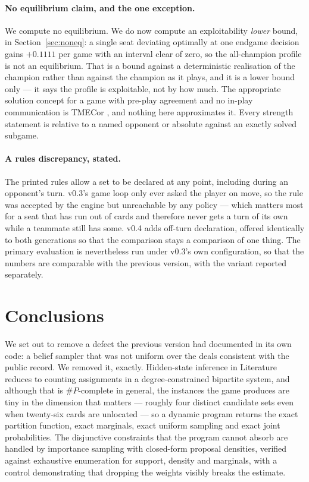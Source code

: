 \documentclass[11pt,a4paper]{article}
\begin{document}
\paragraph{No equilibrium claim, and the one exception.} We compute no
equilibrium. We do now compute an exploitability \emph{lower} bound, in
Section~\ref{sec:noneq}: a single seat deviating optimally at one endgame
decision gains $+0.1111$ per game with an
interval clear of zero, so the all-champion profile is not an equilibrium. That
is a bound against a deterministic realisation of the champion rather than
against the champion as it plays, and it is a lower bound only --- it says the
profile is exploitable, not by how much. The appropriate solution concept for a game with pre-play
agreement and no in-play communication is TMECor
\citep{celli2018computational}, and nothing here approximates it. Every strength
statement is relative to a named opponent or absolute against an exactly solved
subgame.

\paragraph{A rules discrepancy, stated.} The printed rules allow a set to be
declared at any point, including during an opponent's turn. v0.3's game loop
only ever asked the player on move, so the rule was accepted by the engine but
unreachable by any policy --- which matters most for a seat that has run out of
cards and therefore never gets a turn of its own while a teammate still has
some. v0.4 adds off-turn declaration, offered identically to both generations
so that the comparison stays a comparison of one thing. The primary evaluation
is nevertheless run under v0.3's own configuration, so that the numbers are
comparable with the previous version, with the variant reported separately.

\section{Conclusions}
\label{sec:conclusions}

We set out to remove a defect the previous version had documented in its own
code: a belief sampler that was not uniform over the deals consistent with the
public record. We removed it, exactly. Hidden-state inference in Literature
reduces to counting assignments in a degree-constrained bipartite system, and
although that is $\#P$-complete in general, the instances the game produces are
tiny in the dimension that matters --- roughly four distinct candidate sets even
when twenty-six cards are unlocated --- so a dynamic program returns the exact
partition function, exact marginals, exact uniform sampling and exact joint
probabilities. The disjunctive constraints that the program cannot absorb are
handled by importance sampling with closed-form proposal densities, verified
against exhaustive enumeration for support, density and marginals, with a
control demonstrating that dropping the weights visibly breaks the estimate.
\end{document}
